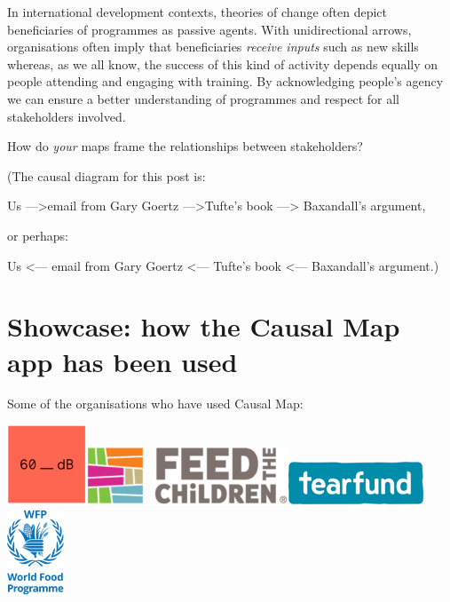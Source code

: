 \documentclass[
]{book}
\begin{document}
In international development contexts, theories of change often depict beneficiaries of programmes as passive agents. With unidirectional arrows, organisations often imply that beneficiaries \emph{receive inputs} such as new skills whereas, as we all know, the success of this kind of activity depends equally on people attending and engaging with training. By acknowledging people's agency we can ensure a better understanding of programmes and respect for all stakeholders involved.

How do \emph{your} maps frame the relationships between stakeholders?

(The causal diagram for this post is:

Us ---\textgreater email from Gary Goertz ---\textgreater Tufte's book ---\textgreater{} Baxandall's argument,

or perhaps:

Us \textless--- email from Gary Goertz \textless--- Tufte's book \textless--- Baxandall's argument.)

\hypertarget{xshowcases}{%
\chapter{Showcase: how the Causal Map app has been used}\label{xshowcases}}

Some of the organisations who have used Causal Map:

\href{https://60decibels.com/}{\includegraphics{_assets/logo1.png}}\href{https://causalmap.app/logo3/}{}\href{http://www.feedthechildren.org/}{\includegraphics{_assets/logo2.png}}\href{https://www.tearfund.org/}{\includegraphics{_assets/logo3.png}} \href{https://www.wfp.org/}{\includegraphics{_assets/image-20220303121340527.png}}
\end{document}
